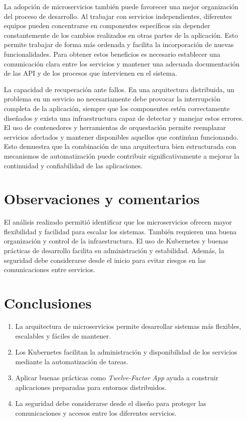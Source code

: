 \documentclass[12pt,letterpaper]{article}
\begin{document}
La adopción de microservicios también puede favorecer una mejor organización del proceso de desarrollo. Al trabajar con servicios independientes, diferentes equipos pueden concentrarse en componentes específicos sin depender constantemente de los cambios realizados en otras partes de la aplicación. Esto permite trabajar de forma más ordenada y facilita la incorporación de nuevas funcionalidades. Para obtener estos beneficios es necesario establecer una comunicación clara entre los servicios y mantener una adecuada documentación de las API y de los procesos que intervienen en el sistema.

La capacidad de recuperación ante fallos. En una arquitectura distribuida, un problema en un servicio no necesariamente debe provocar la interrupción completa de la aplicación, siempre que los componentes estén correctamente diseñados y exista una infraestructura capaz de detectar y manejar estos errores. El uso de contenedores y herramientas de orquestación permite reemplazar servicios afectados y mantener disponibles aquellos que continúan funcionando. Esto demuestra que la combinación de una arquitectura bien estructurada con mecanismos de automatización puede contribuir significativamente a mejorar la continuidad y confiabilidad de las aplicaciones.

\section*{ Observaciones y comentarios}
El análisis realizado permitió identificar que los microservicios ofrecen mayor flexibilidad y facilidad para escalar los sistemas. También requieren una buena organización y control de la infraestructura. El uso de Kubernetes y buenas prácticas de desarrollo facilita su administración y estabilidad. Además, la seguridad debe considerarse desde el inicio para evitar riesgos en las comunicaciones entre servicios.
\section*{Conclusiones}
\begin{enumerate}
    \item La arquitectura de microservicios permite desarrollar sistemas más flexibles, escalables y fáciles de mantener.
    
    \item Los Kubernetes facilitan la administración y disponibilidad de los servicios mediante la automatización de tareas.
    
    \item Aplicar buenas prácticas como \textit{Twelve-Factor App} ayuda a construir aplicaciones preparadas para entornos distribuidos.
    
    \item La seguridad debe considerarse desde el diseño para proteger las comunicaciones y accesos entre los diferentes servicios.
\end{enumerate}
\end{document}
